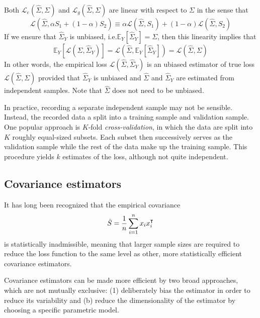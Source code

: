 Both $\mathcal L_e(\hat\Sigma,\Sigma)$ and $\mathcal L_g(\hat\Sigma,\Sigma)$ are linear with respect to $\Sigma$ in the sense that
\begin{equation}
\mathcal L\left(\hat \Sigma,\alpha S_1 + (1-\alpha)S_2\right) 
\equiv 
\alpha\mathcal L(\hat\Sigma,S_1) + (1-\alpha)\mathcal L(\hat\Sigma,S_2)
\end{equation}
If we ensure that  $\hat\Sigma_Y$ is unbiased, i.e.\;$\mathbb E_Y\left[\hat \Sigma_Y\right]=\Sigma$, then this linearity implies that 
\begin{equation}
\mathbb E_Y \left[\mathcal L(\hat\Sigma,\hat\Sigma_Y)\right]
=
\mathcal L\left(\hat\Sigma,\mathbb E_Y \left[\hat\Sigma_Y\right]\right)
= 
\mathcal L(\hat\Sigma,\Sigma)
\end{equation}
In other words, the empirical loss $\mathcal L(\hat\Sigma,\hat\Sigma_Y)$ is an ubiased estimator of true loss $\mathcal L(\hat\Sigma,\Sigma)$ provided that $\hat\Sigma_Y$ is unbiased and $\hat\Sigma$ and $\hat\Sigma_Y$ are estimated from independent samples.  Note that $\hat\Sigma$ does not need to be unbiased.  

In practice, recording a separate independent sample may not be sensible.  Instead, the recorded data a split into a training sample and validation sample.  One popular approach is $K$-fold \emph{cross-validation}, in which the data are split into $K$ roughly equal-sized subsets.  Each subset then successively serves as the validation  sample while the rest of the data make up the training sample. This procedure yields $k$ estimates of the loss, although not quite independent. 
 
\subsection*{Covariance estimators}
It has long been recognized that the empirical covariance 
\begin{equation}
\hat S = \frac 1 n \sum\limits_{i=1}^n x_i x_i^\intercal
\end{equation}
is statistically inadmissible, meaning that larger sample sizes are required to reduce the loss function to the same level as other, more statistically efficient covariance estimators.

Covariance estimators can be made more efficient by two broad approaches, which are not mutually exclusive: (1) deliberately bias the estimator in order to reduce its variability and (b) reduce the dimensionality of the estimator by choosing a specific parametric model. 


